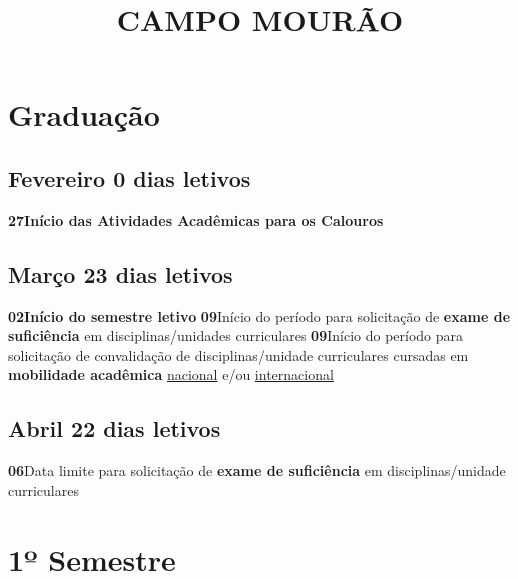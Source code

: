 \documentclass[thesis]{hmcposter}
\author{ }
\title{CAMPO MOURÃO}
\begin{document}
\begin{poster}
\normalsize\section{\color{hmcorange}Graduação}\subsection{Fevereiro \hfill 0 dias letivos}\textbf{27}\qquad \textbf{Início das Atividades Acadêmicas para os Calouros} \newline \null\subsection{Março \hfill 23 dias letivos}\textbf{02}\qquad \textbf{Início do semestre letivo} \newline \null\textbf{09}\qquad Início do período para solicitação de \textbf{exame de suficiência} em disciplinas/unidades curriculares \newline \null\textbf{09}\qquad Início do período para solicitação de convalidação de disciplinas/unidade curriculares cursadas em \textbf{mobilidade acadêmica} \underline{nacional} e/ou \underline{internacional} \newline \null\subsection{Abril \hfill 22 dias letivos}\textbf{06}\qquad Data limite para solicitação de \textbf{exame de suficiência} em disciplinas/unidade curriculares \newline \null\vfill\null
\columnbreak
\section{\hfill \color{hmcorange}1º Semestre}

\end{poster}
\end{document}
